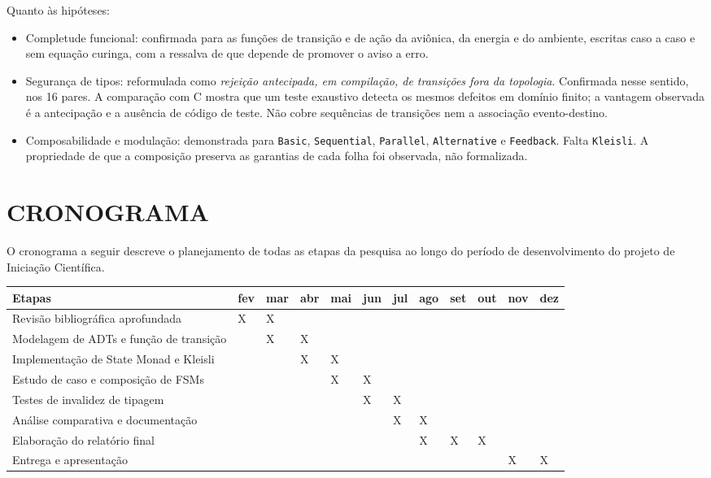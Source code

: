 \documentclass[12pt,a4paper]{article}
\begin{document}
Quanto às hipóteses:

\begin{itemize}
\item Completude funcional: confirmada para as funções de transição e de ação da aviônica, da energia e do ambiente, escritas caso a caso e sem equação curinga, com a ressalva de que depende de promover o aviso a erro.
\item Segurança de tipos: reformulada como \textit{rejeição antecipada, em compilação, de transições fora da topologia}. Confirmada nesse sentido, nos 16 pares. A comparação com C mostra que um teste exaustivo detecta os mesmos defeitos em domínio finito; a vantagem observada é a antecipação e a ausência de código de teste. Não cobre sequências de transições nem a associação evento-destino.
\item Composabilidade e modulação: demonstrada para \texttt{Basic}, \texttt{Sequential}, \texttt{Parallel}, \texttt{Alternative} e \texttt{Feedback}. Falta \texttt{Kleisli}. A propriedade de que a composição preserva as garantias de cada folha foi observada, não formalizada.
\end{itemize}

\section{CRONOGRAMA}

O cronograma a seguir descreve o planejamento de todas as etapas da pesquisa ao longo do período de desenvolvimento do projeto de Iniciação Científica.

\begin{table}[h]
\centering
\small
\begin{tabular}{|p{4.0cm}|p{0.6cm}|p{0.6cm}|p{0.6cm}|p{0.6cm}|p{0.6cm}|p{0.6cm}|p{0.6cm}|p{0.6cm}|p{0.6cm}|p{0.6cm}|p{0.6cm}|}
\hline
\textbf{Etapas} & \textbf{fev} & \textbf{mar} & \textbf{abr} & \textbf{mai} & \textbf{jun} & \textbf{jul} & \textbf{ago} & \textbf{set} & \textbf{out} & \textbf{nov} & \textbf{dez} \\
\hline
Revisão bibliográfica aprofundada & X & X & & & & & & & & & \\
\hline
Modelagem de ADTs e função de transição & & X & X & & & & & & & & \\
\hline
Implementação de State Monad e Kleisli & & & X & X & & & & & & & \\
\hline
Estudo de caso e composição de FSMs & & & & X & X & & & & & & \\
\hline
Testes de invalidez de tipagem & & & & & X & X & & & & & \\
\hline
Análise comparativa e documentação & & & & & & X & X & & & & \\
\hline
Elaboração do relatório final & & & & & & & X & X & X & & \\
\hline
Entrega e apresentação & & & & & & & & & & X & X \\
\hline
\end{tabular}
\end{table}
\end{document}
